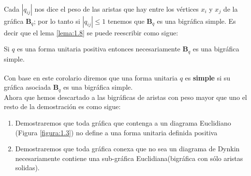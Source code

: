\paragraph{}
Cada $|q_{ij}|$ nos dice el peso de las aristas que hay entre los vértices $x_{i}$ y $x_{j}$ de la gráfica $\textbf{B}_{q}$; por lo tanto si $|q_{ij}| \leq 1$ tenemos que $\textbf{B}_{q}$ es una bigráfica simple. Es decir que el lema \ref{lema:1.8} se puede reescribir como sigue:

\begin{corollary}
Si $q$ es una forma unitaria positiva entonces necesariamente $\textbf{B}_{q}$ es una bigráfica simple.
\label{corolario:1.9}
\end{corollary}

\paragraph{}
Con base en este corolario diremos que una forma unitaria $q$ es \textbf{simple} si su gráfica asociada $\textbf{B}_{q}$ es una bigráfica simple.\\
Ahora que hemos descartado a las bigráficas de aristas con peso mayor que uno el resto de la demostración es como sigue:

\begin{enumerate}
    \item Demostraremos que toda gráfica que contenga a un diagrama Euclidiano (Figura \ref{figura:1.3}) no define a una forma unitaria definida positiva
    \item Demostraremos que toda gráfica conexa que no sea un diagrama de Dynkin necesariamente contiene una sub-gráfica Euclidiana(bigráfica con sólo aristas solidas).
\end{enumerate}

